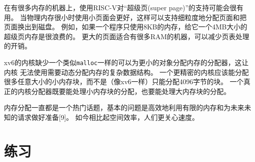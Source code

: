 在有很多内存的机器上，使用RISC-V对“超级页(super page)”的支持可能会很有用。
当物理内存很小时使用小页面会更好，这样可以支持细粒度地分配页面和把页面换出到磁盘。
例如，如果一个程序只使用8KB的内存，给它一个4MB大小的超级页内存是很浪费的。
更大的页面适合有很多RAM的机器，可以减少页表处理的开销。

xv6的内核缺少一个类似\texttt{malloc}一样的可以为更小的对象分配内存的分配器，这让内核
无法使用需要动态分配内存的复杂数据结构。
一个更精密的内核应该能分配很多任意大小的小内存块，而不是（像xv6一样）只能分配4096字节的块。
一个真正的内核分配器既要能处理小内存块的分配，也要能处理大内存块的分配。

内存分配一直都是一个热门话题，基本的问题是高效地利用有限的内存和为未来未知的请求做好准备[9]。
如今相比起空间效率，人们更关心速度。

\section{练习}


